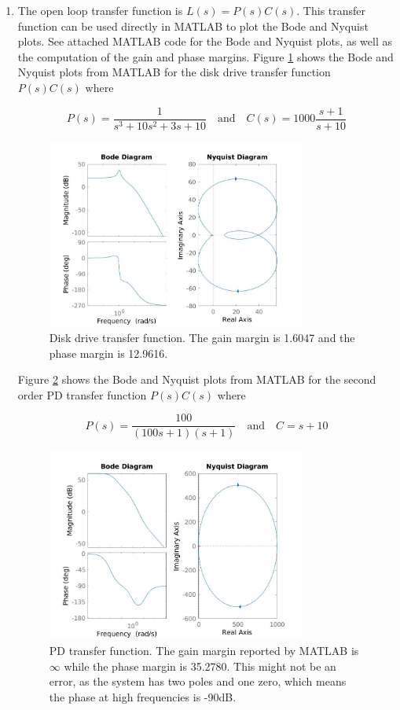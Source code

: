 \documentclass[11pt]{article}
\theoremstyle{definition}
\begin{document}
\begin{enumerate}
    \item %
    The open loop transfer function is $L(s) = P(s) C(s)$.  This transfer function can be used directly in MATLAB to plot the Bode and Nyquist plots.  See attached MATLAB code for the Bode and Nyquist plots, as well as the computation of the gain and phase margins.  Figure \ref{fig:3a} shows the Bode and Nyquist plots from MATLAB for the disk drive transfer function $P(s)C(s)$ where

    $$ P(s) = \frac{1}{s^3 + 10s^2 + 3s + 10} \quad \text{and} \quad C(s) = 1000 \frac{s+1}{s+10} $$

    \begin{figure}[H]
        \centering
        \includegraphics[width = 0.8\textwidth]{ES155P7_3a.jpg}
        \caption{Disk drive transfer function.  The gain margin is 1.6047 and the phase margin is 12.9616.}
        \label{fig:3a}
    \end{figure}

    Figure \ref{fig:3b} shows the Bode and Nyquist plots from MATLAB for the second order PD transfer function $P(s)C(s)$ where

    $$ P(s) = \frac{100}{(100s + 1)(s + 1)} \quad \text{and} \quad C = s + 10 $$

    \begin{figure}[H]
        \centering
        \includegraphics[width = 0.8\textwidth]{ES155P7_3b.jpg}
        \caption{PD transfer function.  The gain margin reported by MATLAB is $\infty$ while the phase margin is 35.2780.  This might not be an error, as the system has two poles and one zero, which means the phase at high frequencies is -90dB.}
        \label{fig:3b}
    \end{figure}



\end{enumerate}
\end{document}
